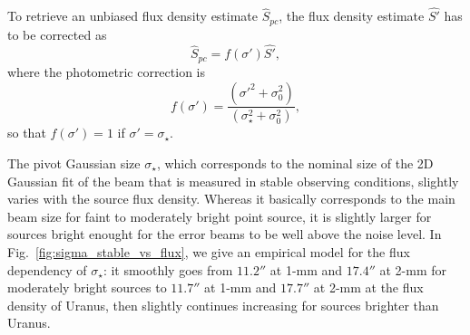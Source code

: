 To retrieve an unbiased flux density estimate $\hat{S}_{pc}$, the
flux density estimate $\hat{S'}$ has to be corrected as
\begin{equation}
  \hat{S}_{pc} = f(\sigma')\hat{S'},
\end{equation} 
where the photometric correction is 
\begin{equation}
  f(\sigma') = \frac{(\sigma'^2 + \sigma_0^2)}{(\sigma_\star^2+\sigma_0^2)}, 
\end{equation} 
so that $f(\sigma') = 1$ if $\sigma'=\sigma_\star$.

The pivot Gaussian size $\sigma_{\star}$, which corresponds
to the nominal size of the 2D Gaussian fit of the beam that is
measured in stable observing conditions, slightly varies with the
source flux density. Whereas it basically corresponds to the main beam
size for faint to moderately bright point source, it is slightly
larger for sources bright enought for the error beams to be well above
the noise level. In Fig.~\ref{fig:sigma_stable_vs_flux}, we give an
empirical model for the flux dependency of $\sigma_{\star}$: it
smoothly goes from $11.2''$ at 1-mm and $17.4''$ at 2-mm for
moderately bright sources to
$11.7''$ at 1-mm and $17.7''$ at 2-mm at the flux density of Uranus,
then slightly continues increasing for sources brighter than Uranus.
